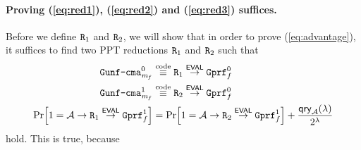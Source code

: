 \documentclass[a4paper,table,dvipsnames]{article}
\theoremstyle{definition}
\newcommand{\M}[1]{\ensuremath{\text{\texttt{#1}}}}
\renewcommand{\O}[1]{\ensuremath{\mathsf{#1}}}
\newcommand{\pcvar}[1]{\ensuremath{\mathit{#1}}}
\newcommand{\m}{\pcvar{m}} %
\begin{document}
\paragraph{Proving (\ref{eq:red1}), (\ref{eq:red2}) and (\ref{eq:red3}) suffices.}
Before we define $\M{R}_1$ and $\M{R}_2$, we will show that in order to prove (\ref{eq:advantage}),
it suffices to
find two PPT reductions $\M{R}_1$ and $\M{R}_2$ such that  
\begin{align}
\label{eq:red1}
\M{Gunf\text{-}cma}_{\m_f}^0&\stackrel{\text{code}}{\equiv}\M{R}_1\stackrel{\O{EVAL}}{\rightarrow}\M{Gprf}^0_f\\
\label{eq:red2}
\M{Gunf\text{-}cma}_{\m_f}^1&\stackrel{\text{code}}{\equiv}\M{R}_2\stackrel{\O{EVAL}}{\rightarrow}\M{Gprf}^0_f\\
\label{eq:red3}
\prob{1=\adv\rightarrow\M{R}_1\stackrel{\O{EVAL}}{\rightarrow}\M{Gprf}^1_f}&=\prob{1=\adv\rightarrow\M{R}_2\stackrel{\O{EVAL}}{\rightarrow}\M{Gprf}^1_f}+\frac{\O{qry}_{\adv}(\lambda)}{2^\lambda}
\end{align}
hold. This is true, because
\end{document}
